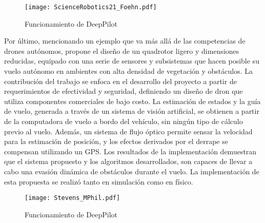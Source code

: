 \begin{figure}[ht]
    \centering
    \texttt{[image: ScienceRobotics21\_Foehn.pdf]}
    \caption{Funcionamiento de DeepPilot\cite{foehn2021time}}
    \label{fig:Foehn}
\end{figure}

Por último, mencionando un ejemplo que va más allá de las competencias de drones autónomos, \cite{stevens2021autonomous} propone el diseño de un quadrotor ligero y dimensiones reducidas, equipado con una serie de sensores y subsistemas que hacen posible su vuelo autónomo en ambientes con alta densidad de vegetación y obstáculos.  La contribución del trabajo se enfoca en el desarrollo del proyecto a partir de requerimientos de efectividad y seguridad, definiendo un diseño de dron que utiliza componentes comerciales de bajo costo. La estimación de estados y la guía de vuelo, generada a través de un sistema de visión artificial, se obtienen a partir de la computadora de vuelo a bordo del vehículo, sin ningún tipo de cálculo previo al vuelo. Además, un sistema de flujo óptico permite sensar la velocidad para la estimación de posición, y los efectos derivados por el derrape se compensan utilizando un GPS.
Los resultados de la implementación demuestran que el sistema propuesto y los algoritmos desarrollados, son capaces de llevar a cabo una evasión dinámica de obstáculos durante el vuelo. La implementación de esta propuesta se realizó tanto en simulación como en físico. 


\begin{figure}[ht]
    \centering
    \texttt{[image: Stevens\_MPhil.pdf]}
    \caption{Funcionamiento de DeepPilot\cite{stevens2021autonomous}}
    \label{fig:Stevens}
\end{figure}